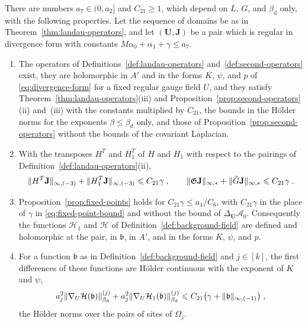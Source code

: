 \documentclass[11pt]{preprint}
\DeclarePairedDelimiter{\norm}{\lVert}{\rVert}
\numberwithin{equation}{section}
\begin{document}
\begin{proposition}\label{prop:divergence-form}
There are numbers $a_7 \in (0, a_2]$ and $C_{21} \geqslant 1$, which depend on $L$, $G$, and $\beta_{\mathrm d}$ only, with the following properties. Let the sequence of domains be as in Theorem~\ref{thm:landau-operators}, and let $(\mathbf U, \mathbf J)$ be a pair which is regular in divergence form with constants $M\alpha_0 + \alpha_1 + \gamma \leqslant a_7$.
\begin{enumerate}[label=(\roman*)]
\item The operators of Definitions~\ref{def:landau-operators} and~\ref{def:second-operators} exist, they are holomorphic in $A'$ and in the forms $K$, $\psi$, and $p$ of \eqref{eq:divergence-form} for a fixed regular gauge field $U$, and they satisfy Theorem~\ref{thm:landau-operators}(iii) and Proposition~\ref{prop:second-operators}(ii) and~(iii) with the constants multiplied by $C_{21}$, the bounds in the H\"older norms for the exponents $\beta \leqslant \beta_{\mathrm d}$ only, and those of Proposition~\ref{prop:second-operators} without the bounds of the covariant Laplacian.
\item With the transposes $H^T$ and $H_1^T$ of $H$ and $H_1$ with respect to the pairings of Definition~\ref{def:landau-operators}(ii),
\begin{equation}\label{eq:divergence-functionals}
    \norm{H^T\mathbf J}_{\infty,(-3)} + \norm{H_1^T\mathbf J}_{\infty,(-3)} \leqslant C_{21}\gamma\;,
    \qquad
    \norm{\mathfrak G\mathbf J}_{\infty,*} + \norm{\tilde G\mathbf J}_{\infty,*} \leqslant C_{21}\gamma\;.
\end{equation}
\item Proposition~\ref{prop:fixed-points} holds for $C_{21}\gamma \leqslant a_4/C_6$, with $C_{21}\gamma$ in the place of $\gamma$ in \eqref{eq:fixed-point-bound} and without the bound of $\Delta_{\mathbf U}\mathcal A_0$. Consequently the functions $\mathcal H_1$ and $\mathcal H$ of Definition~\ref{def:background-field} are defined and holomorphic at the pair, in $\mathfrak b$, in $A'$, and in the forms $K$, $\psi$, and $p$.
\item For a function $\mathfrak b$ as in Definition~\ref{def:background-field} and $j \in [k]$, the first differences of these functions are H\"older continuous with the exponent of $K$ and $\psi$,
\begin{equation}\label{eq:divergence-holder}
    a_j^2\norm{\nabla_U\mathcal H(\mathfrak b)}^{(j)}_{\beta_{\mathrm d}} + a_j^2\norm{\nabla_U\mathcal H_1(\mathfrak b)}^{(j)}_{\beta_{\mathrm d}} \leqslant C_{21}\bigl(\gamma + \norm{\mathfrak b}_{\infty,(-1)}\bigr)\;,
\end{equation}
the H\"older norms over the pairs of sites of $\Omega_j$.
\end{enumerate}
\end{proposition}
\end{document}
